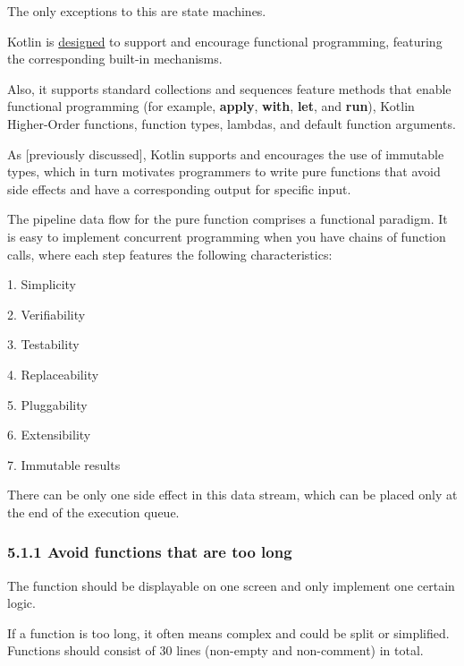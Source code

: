 {{{{{{{{{{{{{{{{{{{{The only exceptions to this are state machines.



Kotlin is \href{https://www.slideshare.net/abreslav/whos-more-functional-kotlin-groovy-scala-or-java}{designed} to support and encourage functional programming, featuring the corresponding built-in mechanisms.

Also, it supports standard collections and sequences feature methods that enable functional programming (for example, \textbf{apply}, \textbf{with}, \textbf{let}, and \textbf{run}), Kotlin Higher-Order functions, function types, lambdas, and default function arguments.

As [previously discussed], Kotlin supports and encourages the use of immutable types, which in turn motivates programmers to write pure functions that avoid side effects and have a corresponding output for specific input. 

The pipeline data flow for the pure function comprises a functional paradigm. It is easy to implement concurrent programming when you have chains of function calls, where each step features the following characteristics:

1.	Simplicity

2.	Verifiability

3.	Testability

4.	Replaceability

5.	Pluggability

6.	Extensibility

7.	Immutable results



There can be only one side effect in this data stream, which can be placed only at the end of the execution queue.



\subsubsection*{\textbf{5.1.1 Avoid functions that are too long}}
\leavevmode\newline

\label{sec:5.1.1}



The function should be displayable on one screen and only implement one certain logic.

If a function is too long, it often means complex and could be split or simplified. Functions should consist of 30 lines (non-empty and non-comment) in total.



}}}}}}}}}}}}}}}}}}}}
